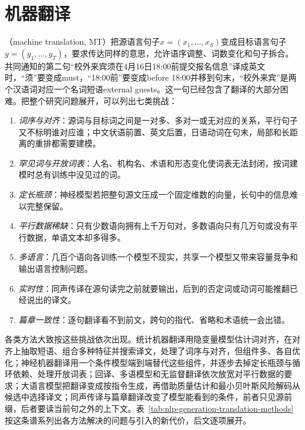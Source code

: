 \section{机器翻译}
\label{sec:nlp-generation-translation}

（machine translation, MT）把源语言句子$x=(x_1,\ldots,x_S)$变成目标语言句子$y=(y_1,\ldots,y_T)$，要求传达同样的意思，允许语序调整、词数变化和句子拆合。共同通知的第二句“校外来宾须在4月16日18:00前提交报名信息”译成英文时，“须”要变成must，“18:00前”要变成before 18:00并移到句末，“校外来宾”是两个汉语词对应一个名词短语external guests。这一句已经包含了翻译的大部分困难。把整个研究问题展开，可以列出七类挑战：
\begin{enumerate}
  \item \emph{词序与对齐}：源词与目标词之间是一对多、多对一或无对应的关系，平行句子又不标明谁对应谁；中文状语前置、英文后置，日语动词在句末，局部和长距离的重排都需要建模。
  \item \emph{罕见词与开放词表}：人名、机构名、术语和形态变化使词表无法封闭，按词建模时总有训练中没见过的词。
  \item \emph{定长瓶颈}：神经模型若把整句源文压成一个固定维数的向量，长句中的信息难以完整保留。
  \item \emph{平行数据稀缺}：只有少数语向拥有上千万句对，多数语向只有几万句或没有平行数据，单语文本却多得多。
  \item \emph{多语言}：几百个语向各训练一个模型不现实，共享一个模型又带来容量竞争和输出语言控制问题。
  \item \emph{实时性}：同声传译在源句读完之前就要输出，后到的否定词或动词可能推翻已经说出的译文。
  \item \emph{篇章一致性}：逐句翻译看不到前文，跨句的指代、省略和术语统一会出错。
\end{enumerate}

各类方法大致按这些挑战依次出现。统计机器翻译用隐变量模型估计词对齐，在对齐上抽取短语、组合多种特征并搜索译文，处理了词序与对齐，但组件多、各自优化；神经机器翻译用一个条件模型端到端替代这些组件，并逐步去掉定长瓶颈与循环依赖、处理开放词表；回译、多语模型和无监督翻译依次放宽对平行数据的要求；大语言模型把翻译变成按指令生成，再借助质量估计和最小贝叶斯风险解码从候选中选择译文；同声传译与篇章翻译改变了模型能看到的条件，前者只见源前缀，后者要读当前句之外的上下文。表~\ref{tab:nlp-generation-translation-methods}按这条谱系列出各方法解决的问题与引入的新代价，后文逐项展开。

